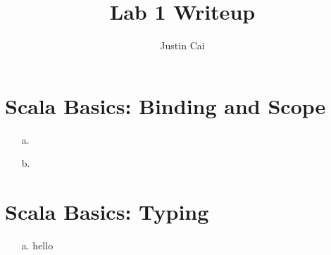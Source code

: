 \documentclass[11pt, letter]{article}
\title{Lab 1 Writeup}
\author{Justin Cai}
\begin{document}
    \maketitle

    \section{Scala Basics: Binding and Scope}
    \begin{itemize}
        \item [a.]
        \item [b.] 
    \end{itemize}

    \section{Scala Basics: Typing}
    \begin{itemize}
        \item [a.] hello
    \end{itemize}
\end{document}
